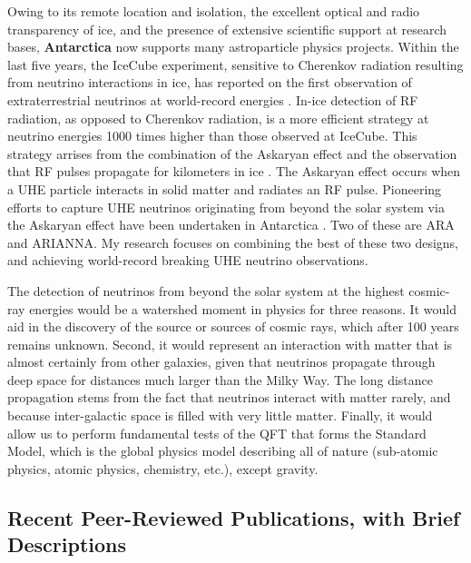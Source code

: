 \documentclass[../../main.tex]{subfiles}
\begin{document}
Owing to its remote location and isolation, the excellent optical and radio transparency of ice, and the presence of extensive scientific support at research bases, \textbf{Antarctica} now supports many astroparticle physics projects.  Within the last five years,  the IceCube experiment, sensitive to Cherenkov radiation resulting from neutrino interactions in ice, has reported on the first observation of extraterrestrial neutrinos at world-record energies \cite{Aartsen:2016xlq}.  In-ice detection of RF radiation, as opposed to Cherenkov radiation, is a more efficient strategy at neutrino energies 1000 times higher than those observed at IceCube. This strategy arrises from the combination of the Askaryan effect \cite{Askaryan:1962hbi,1962JPSJS..17C.257A,1965JETP...21..658A} and the observation that RF pulses propagate for kilometers in ice \cite{barrella_barwick_saltzberg_2011,barwick_besson_gorham_saltzberg_2005}.  The Askaryan effect occurs when a UHE particle interacts in solid matter and radiates an RF pulse.  Pioneering efforts to capture UHE neutrinos originating from beyond the solar system via the Askaryan effect have been undertaken in Antarctica \cite{Allison:2015eky,Barwick:2014pca,Gorham:2008dv,Kravchenko:2001id}.  Two of these are ARA and ARIANNA.  My research focuses on combining the best of these two designs, and achieving world-record breaking UHE neutrino observations. \\ \hspace{0.1cm}

The detection of neutrinos from beyond the solar system at the highest cosmic-ray energies would be a watershed moment in physics for three reasons.  It would aid in the discovery of the source or sources of cosmic rays, which after 100 years remains unknown.  Second, it would represent an interaction with matter that is almost certainly from other galaxies, given that neutrinos propagate through deep space for distances much larger than the Milky Way.  The long distance propagation stems from the fact that neutrinos interact with matter rarely, and because inter-galactic space is filled with very little matter.  Finally, it would allow us to perform fundamental tests of the QFT that forms the Standard Model, which is the global physics model describing all of nature (sub-atomic physics, atomic physics, chemistry, etc.), except gravity.

\subsection{Recent Peer-Reviewed Publications, with Brief Descriptions}
\end{document}
